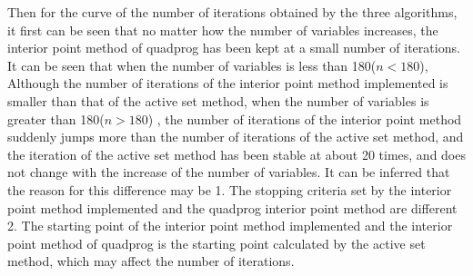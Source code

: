 Then for the curve of the number of iterations obtained by the three algorithms, it first can be seen that no matter how the number of variables increases, the interior point method of quadprog has been kept at a small number of iterations. It can be seen that when the number of variables is less than 180($n<180$), Although the number of iterations of the interior point method implemented is smaller than that of the active set method, when the number of variables is greater than 180($n>180$) , the number of iterations of the interior point method suddenly jumps more than the number of iterations of the active set method, and the iteration of the active set method has been stable at about 20 times, and does not change with the increase of the number of variables. It can be inferred that the reason for this difference may be 1. The stopping criteria set by the interior point method implemented and the quadprog interior point method are different 2. The starting point of the interior point method implemented and the interior point method of quadprog is the starting point calculated by the active set method, which may affect the number of iterations.

